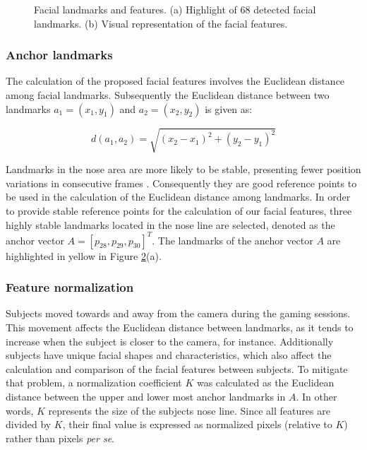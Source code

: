 \begin{figure}
\begin{subfigure}[b]{0.5\textwidth}
    \caption{}
    \label{fig:facial-features}
  \end{subfigure}
  \caption{Facial landmarks and features. (a) Highlight of 68 detected facial landmarks. (b) Visual representation of the facial features.}
  \label{fig:faces}
\end{figure}


\subsubsection{Anchor landmarks}

The calculation of the proposed facial features involves the Euclidean distance among facial landmarks. Subsequently the Euclidean distance between two landmarks $a_1 = (x_1, y_1)$ and $a_2 = (x_2, y_2)$ is given as:

\[
d(a_1,a_2) = \sqrt{(x_2 - x_1)^2 + (y_2 - y_1)^2}
\]

Landmarks in the nose area are more likely to be stable, presenting fewer position variations in consecutive frames \parencite{giannakakis2017stress}. Consequently they are good reference points to be used in the calculation of the Euclidean distance among landmarks. In order to provide stable reference points for the calculation of our facial features, three highly stable landmarks located in the nose line are selected, denoted as the anchor vector $A = [p_{28}, p_{29}, p_{30}]^T$. The landmarks of the anchor vector $A$ are highlighted in yellow in Figure \ref{fig:faces}(a).

\subsubsection{Feature normalization}

Subjects moved towards and away from the camera during the gaming sessions. This movement affects the Euclidean distance between landmarks, as it tends to increase when the subject is closer to the camera, for instance. Additionally subjects have unique facial shapes and characteristics, which also affect the calculation and comparison of the facial features between subjects. To mitigate that problem, a normalization coefficient $K$ was calculated as the Euclidean distance between the upper and lower most anchor landmarks in $A$. In other words, $K$ represents the size of the subjects nose line. Since all features are divided by $K$, their final value is expressed as normalized pixels (relative to $K$) rather than pixels \textit{per se}.

